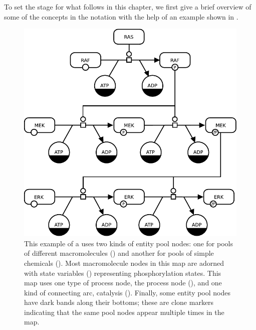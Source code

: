 
To set the stage for what follows in this chapter, we first give a brief overview of some of the concepts in the \PD notation with the help of an example shown in .

\begin{figure}[H]
  \centering
  \vspace*{-0.75em}
  \includegraphics[scale=0.8]{examples/MAPK-only}
  \caption{This example of a \PD uses two kinds of entity pool nodes: one
    for pools of different macromolecules () and
    another for pools of simple chemicals ().  Most
    macromolecule nodes in this map are adorned with state
    variables () representing phosphorylation states.
    This map uses one type of process node, the process node
    (), and one kind of connecting arc, catalysis
    ().  Finally, some entity pool nodes have dark bands
    along their bottoms; these are clone markers indicating that the same
    pool nodes appear multiple times in the map.}
  \label{fig:eg1}
\end{figure}

